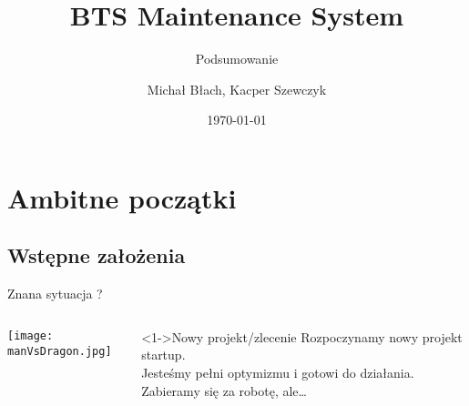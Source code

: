 \documentclass{beamer}
\title{BTS Maintenance System }
\subtitle{Podsumowanie}
\author{Michał Błach, Kacper Szewczyk}
\date{\today}
\begin{document}
\begin{frame}
\titlepage
\end{frame}
\begin{frame}
\tableofcontents
\end{frame}
\section{Ambitne początki}

\subsection{Wstępne założenia}
\begin{frame}{Znana sytuacja ?}
     \begin{columns}[T] %
      \begin{column}[T]{8cm} %
          \texttt{[image: manVsDragon.jpg]}
     \end{column}
     \begin{column}[T]{4cm} %
     \begin{block}<1->{Nowy projekt/zlecenie}
	Rozpoczynamy nowy projekt startup.\\
	Jesteśmy pełni optymizmu i gotowi do działania. Zabieramy się za robotę, ale\dots 
\end{block}
     \end{column}
     \end{columns}
\end{frame}
\end{document}
